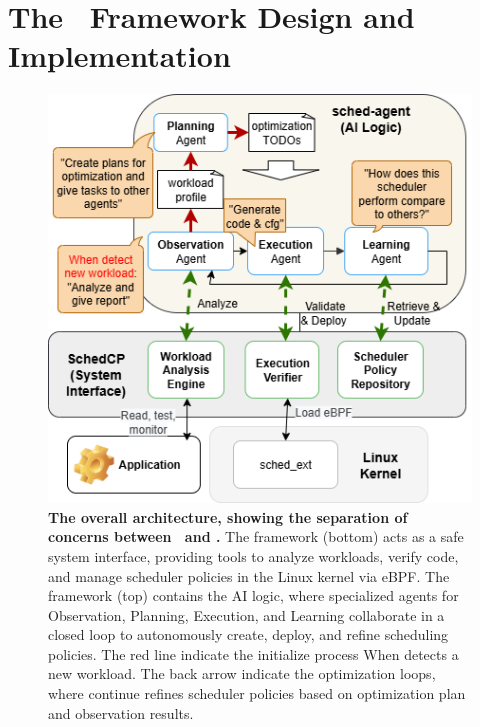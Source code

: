 \section{The \sys\ Framework Design and Implementation}
\label{sec:schedcp_framework}

\begin{figure}
    \centering
    \includegraphics[width=0.9\columnwidth]{sections/img/arch-scheddcp.png}
    \caption{
        \textbf{The overall architecture, showing the separation of concerns between \sys\ and \agent.} 
        The \textbf{\sys} framework (bottom) acts as a safe system interface, providing tools to analyze workloads, verify code, and manage scheduler policies in the Linux kernel via eBPF.
        The \textbf{\agent} framework (top) contains the AI logic, where specialized agents for Observation, Planning, Execution, and Learning collaborate in a closed loop to autonomously create, deploy, and refine scheduling policies. The red line indicate the initialize process When \sys detects a new workload. The back arrow indicate the optimization loops, where \agent continue refines scheduler policies based on optimization plan and observation results.
    }
    \label{fig:frameworkarch}
\end{figure}

